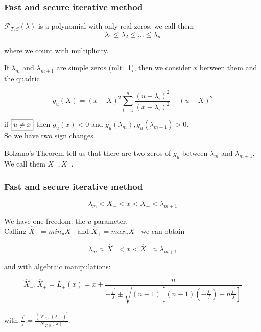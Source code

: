 \documentclass{beamer}
\newcommand{\effe}[2]{\mathcal{F}_{#1}(#2)}
\theoremstyle{definition} \newtheorem{de}{Def}
\theoremstyle{remark} \newtheorem{os}[de]{Remark}
\theoremstyle{plain} \newtheorem{te}[de]{Teo}
\theoremstyle{plain} \newtheorem{co}[de]{Cor}
\theoremstyle{plain} \newtheorem{pr}[de]{Prop}
\theoremstyle{plain} \newtheorem{lem}[de]{Lemm}
\theoremstyle{remark} \newtheorem{rem}[de]{Remark}
\begin{document}
\begin{frame}
\frametitle{Fast and secure iterative method}

$\effe{T,S}{\lambda}$ is a polynomial with only real zeros; we call them
\begin{equation*}
  \lambda_1 \le \lambda_2 \le \dots \le \lambda_n
\end{equation*}

where we count with multiplicity.\\ 

\pause 

If $\lambda_m$ and $\lambda_{m+1}$ are simple zeros (mlt=1), then we consider $x$ between them and the quadric

\pause

\begin{equation*}
  g_{u}(X) = (x-X)^2 \sum_{i=1}^n \frac{(u-\lambda_i)^2}{(x-\lambda_i)^2} - (u-X)^2
\end{equation*}

\pause

if $\fbox{$u\neq x$}$ then $g_{u}(x)<0$ and $g_u(\lambda_m),g_u(\lambda_{m+1})>0$. \\
So we have two sign changes. \\

\pause

Bolzano's Theorem tell us that there are two zeros of $g_{u}$ between $\lambda_m$ and $\lambda_{m+1}$. We call them $X_{-},X_{+}$.

\end{frame}

\begin{frame}
\frametitle{Fast and secure iterative method}

\begin{equation*}
  \lambda_m < X_{-} < x < X_{+} < \lambda_{m+1}
\end{equation*}

We have one freedom: the $u$ parameter. \\
Calling $\hat X_{-}=min_{u} X_{-}$ and $\hat X_{+}=max_{u} X_{+}$  we can obtain


\begin{equation*}
  \lambda_m \approx \hat X_{-} < x < \hat X_{+} \approx \lambda_{m+1}
\end{equation*}

and with algebraic manipulations: 

\begin{equation*}
  \hat X_{-}, \hat X_{+} = L_{\pm}(x) = x + \frac{ n }{ -\frac{f^{'}}{f} \pm \sqrt{(n-1)[ (n-1)(-\frac{f^{'}}{f}) -n\frac{f^{''}}{f} ]} }
\end{equation*}

with $\frac{f^{'}}{f}=\frac{ (\effe{T,S}{\lambda})^{'} }{ \effe{T,S}{\lambda} }$. 

\end{frame}
\end{document}
